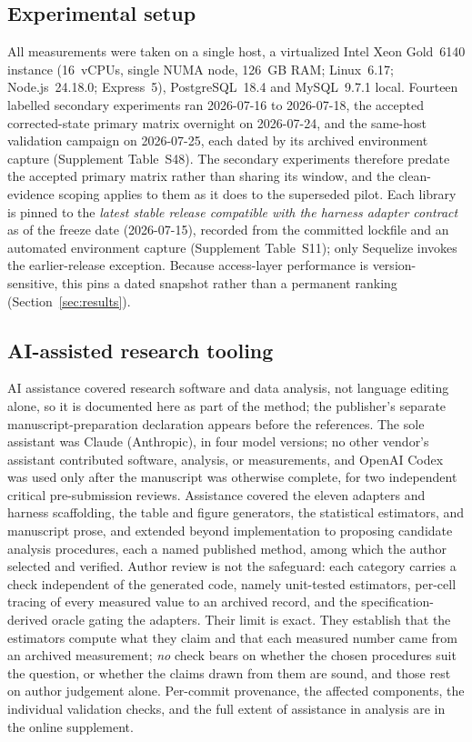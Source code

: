 \subsection{Experimental setup}
All measurements were taken on a single host, a virtualized Intel Xeon Gold~6140 instance (16~vCPUs, single NUMA node, 126~GB RAM; Linux~6.17; Node.js~24.18.0; Express~5), PostgreSQL~18.4 and MySQL~9.7.1 local.
Fourteen labelled secondary experiments ran 2026-07-16 to 2026-07-18, the accepted corrected-state primary matrix overnight on 2026-07-24, and the same-host validation campaign on 2026-07-25, each dated by its archived environment capture (Supplement Table~S48).
The secondary experiments therefore predate the accepted primary matrix rather than sharing its window, and the clean-evidence scoping applies to them as it does to the superseded pilot.
Each library is pinned to the \emph{latest stable release compatible with the harness adapter contract} as of the freeze date (2026-07-15), recorded from the committed lockfile and an automated environment capture (Supplement Table~S11); only Sequelize invokes the earlier-release exception.
Because access-layer performance is version-sensitive, this pins a dated snapshot rather than a permanent ranking (Section~\ref{sec:results}).

\subsection{AI-assisted research tooling}
\label{sec:ai-tooling}
AI assistance covered research software and data analysis, not language editing alone, so it is documented here as part of the method; the publisher's separate manuscript-preparation declaration appears before the references.
The sole assistant was Claude (Anthropic), in four model versions; no other vendor's assistant contributed software, analysis, or measurements, and OpenAI Codex was used only after the manuscript was otherwise complete, for two independent critical pre-submission reviews.
Assistance covered the eleven adapters and harness scaffolding, the table and figure generators, the statistical estimators, and manuscript prose, and extended beyond implementation to proposing candidate analysis procedures, each a named published method, among which the author selected and verified.
Author review is not the safeguard: each category carries a check independent of the generated code, namely unit-tested estimators, per-cell tracing of every measured value to an archived record, and the specification-derived oracle gating the adapters.
Their limit is exact. They establish that the estimators compute what they claim and that each measured number came from an archived measurement; \emph{no} check bears on whether the chosen procedures suit the question, or whether the claims drawn from them are sound, and those rest on author judgement alone.
Per-commit provenance, the affected components, the individual validation checks, and the full extent of assistance in analysis are in the online supplement.

